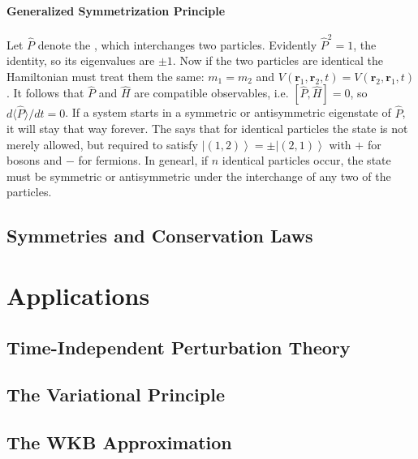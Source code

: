\documentclass[12pt, a4paper, oneside, openright, titlepage]{book}
\newcommand{\ket}[1]{\left\vert#1\right\rangle}
\begin{document}
\subsection{Generalized Symmetrization Principle}

Let $\hat{P}$ denote the , which interchanges two particles. Evidently $\hat{P}^2 = 1$, the identity, so its eigenvalues are $\pm 1$. Now if the two particles are identical the Hamiltonian must treat them the same: $m_1 = m_2$ and $V(\mathbf{r}_1,\mathbf{r}_2,t) = V(\mathbf{r}_2,\mathbf{r}_1,t)$. It follows that $\hat{P}$ and $\hat{H}$ are compatible observables, i.e. $[\hat{P},\hat{H}] = 0$, so $d\langle \hat{P}\rangle/dt = 0$. If a system starts in a symmetric or antisymmetric eigenstate of $\hat{P}$, it will stay that way forever. The  says that for identical particles the state is not merely allowed, but required to satisfy $\ket{(1,2)} = \pm\ket{(2,1)}$ with $+$ for bosons and $-$ for fermions. In genearl, if $n$ identical particles occur, the state must be symmetric or antisymmetric under the interchange of any two of the particles. 


\chapter{Symmetries and Conservation Laws}



\part{Applications}

\chapter{Time-Independent Perturbation Theory}



\chapter{The Variational Principle}



\chapter{The WKB Approximation}
\end{document}
